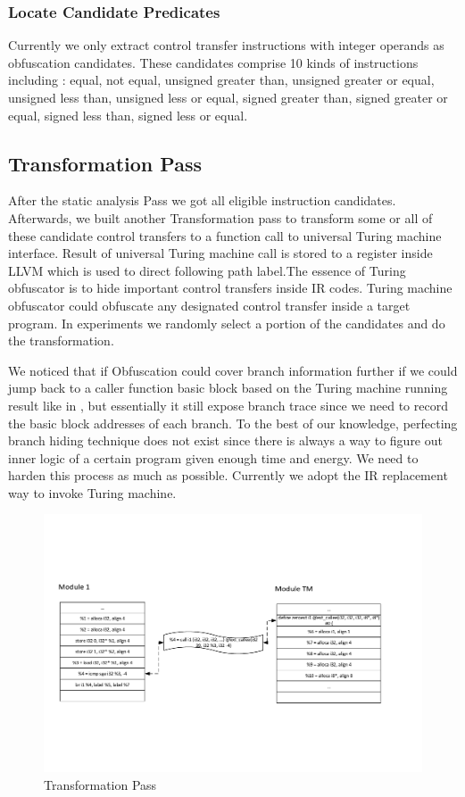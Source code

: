 \documentclass[lnicst]{svmultln}
\begin{document}
\subsubsection{Locate Candidate Predicates}
Currently we only extract control transfer instructions with integer operands as
obfuscation candidates. These candidates comprise 10 kinds of instructions
including : equal, not equal, unsigned greater than, unsigned greater or equal,
unsigned less than, unsigned less or equal, signed greater than, signed greater
or equal, signed less than, signed less or equal.
\subsection{Transformation Pass}
After the static analysis Pass we got all eligible instruction candidates.
Afterwards, we built another Transformation pass to transform some or all of
these candidate control transfers to a function call to universal Turing machine
interface. Result of universal Turing machine call is stored to a register
inside LLVM which is used to direct following path label.The essence of Turing
obfuscator is to hide important control transfers inside IR codes. Turing machine
obfuscator could obfuscate any designated control transfer inside a target
program. In experiments we randomly select a portion of the candidates and do
the transformation.

We noticed that if Obfuscation could cover branch information further if we
could jump back to a caller function basic block based on the Turing machine
running result like in \cite{Ma}, but essentially it still expose branch trace
since we need to record the basic block addresses of each branch. To the best of
our knowledge, perfecting branch hiding technique does not exist since there is
always a way to figure out inner logic of a certain program given enough time
and energy. We need to harden this process as much as possible. Currently we
adopt the IR replacement way to invoke Turing machine.
\begin{figure}
 \includegraphics[width=\linewidth]{transform_pass.pdf}
 \caption{Transformation Pass}
 \label{Figure 6}
\end{figure}
\end{document}
